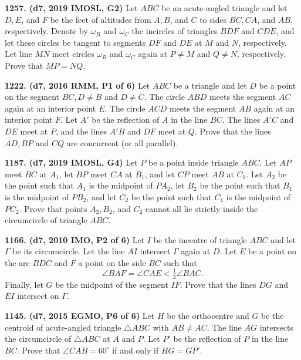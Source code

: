 \documentclass{article}
\begin{document}
\textbf{1257. (\color{red}d7\color{black}, 2019 IMOSL, G2)} Let $ABC$ be an acute-angled triangle and let $D, E$, and $F$ be the feet of altitudes from $A, B$, and $C$ to sides $BC, CA$, and $AB$, respectively. Denote by $\omega_B$ and $\omega_C$ the incircles of triangles $BDF$ and $CDE$, and let these circles be tangent to segments $DF$ and $DE$ at $M$ and $N$, respectively. Let line $MN$ meet circles $\omega_B$ and $\omega_C$ again at $P \ne M$ and $Q \ne N$, respectively. Prove that $MP = NQ$.

\textbf{1222. (\color{red}d7\color{black}, 2016 RMM, P1 of 6)} Let $ABC$ be a triangle and let $D$ be a point on the segment $BC, D\neq B$ and $D\neq C$. The circle $ABD$ meets the segment $AC$ again at an interior point $E$. The circle $ACD$ meets the segment $AB$ again at an interior point $F$. Let $A'$ be the reflection of $A$ in the line $BC$. The lines $A'C$ and $DE$ meet at $P$, and the lines $A'B$ and $DF$ meet at $Q$. Prove that the lines $AD, BP$ and $CQ$ are concurrent (or all parallel).

\textbf{1187. (\color{red}d7\color{black}, 2019 IMOSL, G4)} Let $P$ be a point inside triangle $ABC$. Let $AP$ meet $BC$ at $A_1$, let $BP$ meet $CA$ at $B_1$, and let $CP$ meet $AB$ at $C_1$. Let $A_2$ be the point such that $A_1$ is the midpoint of $PA_2$, let $B_2$ be the point such that $B_1$ is the midpoint of $PB_2$, and let $C_2$ be the point such that $C_1$ is the midpoint of $PC_2$. Prove that points $A_2, B_2$, and $C_2$ cannot all lie strictly inside the circumcircle of triangle $ABC$.

\textbf{1166. (\color{red}d7\color{black}, 2010 IMO, P2 of 6)} %
Let \(I\) be the incentre of triangle \(ABC\) and let \(\Gamma\) be its circumcircle.  Let the line \(AI\) intersect \(\Gamma\) again at \(D\).  Let \(E\) be a point on the arc \(BDC\) and \(F\) a point on the side \(BC\) such that \[\angle BAF = \angle CAE < \tfrac{1}{2} \angle BAC.\]  Finally, let \(G\) be the midpoint of the segment \(IF\).  Prove that the lines \(DG\) and \(EI\) intersect on \(\Gamma\).

\textbf{1145. (\color{red}d7\color{black}, 2015 EGMO, P6 of 6)} Let $H$ be the orthocentre and $G$ be the centroid of acute-angled triangle $\triangle ABC$ with $AB\ne AC$. The line $AG$ intersects the circumcircle of $\triangle ABC$ at $A$ and $P$. Let $P'$ be the reflection of $P$ in the line $BC$. Prove that $\angle CAB = 60^\circ$ if and only if $HG = GP'$.
\end{document}
